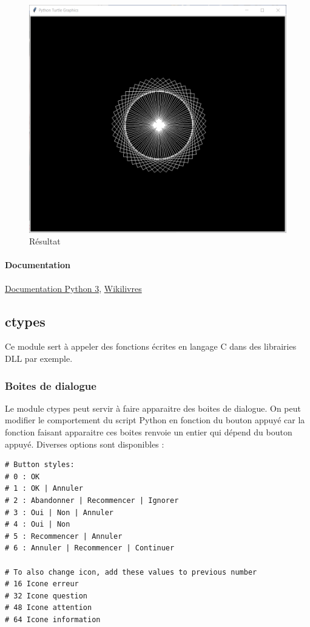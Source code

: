 \documentclass[a4paper, 10pt]{article}
\begin{document}
\begin{figure}[h]
\begin{center}
\includegraphics[scale=0.5]{turtle.png}
\caption*{Résultat}
\end{center}
\end{figure}

\paragraph{Documentation} \href{https://docs.python.org/fr/3.6/library/turtle.html#methods-specific-to-screen-not-inherited-from-turtlescreen}{Documentation Python 3}, \href{https://fr.wikibooks.org/wiki/Programmation_Python/Turtle}{Wikilivres}

\subsection{ctypes}
 Ce module sert à appeler des fonctions écrites en langage C dans des librairies DLL par exemple.
\subsubsection{Boites de dialogue}
 Le module ctypes peut servir à faire apparaitre des boites de dialogue. On peut modifier le comportement du script Python en fonction du bouton appuyé car la fonction faisant apparaitre ces boites renvoie un entier qui dépend du bouton appuyé. Diverses options sont disponibles :
\begin{verbatim}
# Button styles:
# 0 : OK
# 1 : OK | Annuler
# 2 : Abandonner | Recommencer | Ignorer
# 3 : Oui | Non | Annuler
# 4 : Oui | Non
# 5 : Recommencer | Annuler 
# 6 : Annuler | Recommencer | Continuer

# To also change icon, add these values to previous number
# 16 Icone erreur
# 32 Icone question
# 48 Icone attention
# 64 Icone information
\end{verbatim}
\end{document}
